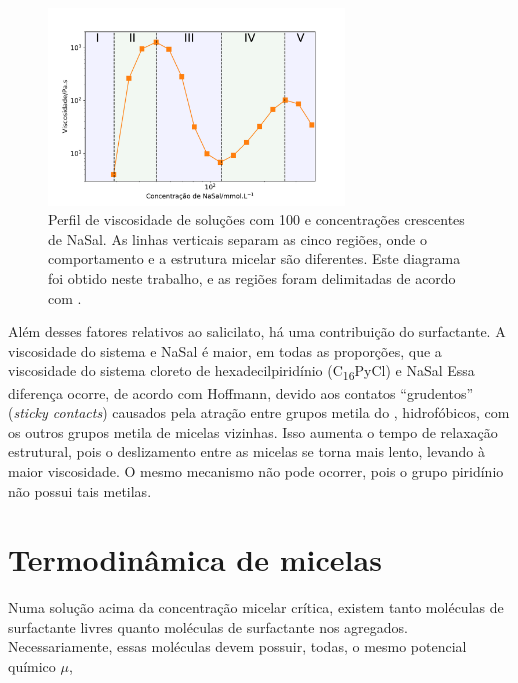 		\begin{figure}[h]
			\centering
			\includegraphics[width=0.7\textwidth]{imagens/reologia/regioes_RH}
			\caption{Perfil de viscosidade de soluções com \CTAB{} 100 \mM{} e concentrações crescentes de NaSal. As linhas verticais separam as cinco regiões, onde o comportamento e a estrutura micelar são diferentes. Este diagrama foi obtido neste trabalho, e as regiões foram delimitadas de acordo com \citeauthor{Rehage1988}.}
			\label{fig:regioes_rh}
		\end{figure}

		Além desses fatores relativos ao salicilato, há uma contribuição do surfactante. A viscosidade do sistema \CTAB{} e NaSal é maior, em todas as proporções, que a viscosidade do sistema cloreto de hexadecilpiridínio (C\textsubscript{16}PyCl) e NaSal \cite{Lutz-Bueno2017}
		Essa diferença ocorre, de acordo com Hoffmann,\cite{Hoffmann2010, Hoffmann2012a, Yamashita2006} devido aos contatos ``grudentos'' (\emph{sticky contacts}) causados pela atração entre grupos metila do \CTAB, hidrofóbicos, com os outros grupos metila de micelas vizinhas. Isso aumenta o tempo de relaxação estrutural, pois o deslizamento entre as micelas se torna mais lento, levando à maior viscosidade. O mesmo mecanismo não pode ocorrer, pois o grupo piridínio não possui tais metilas.  
		

		\section{Termodinâmica de micelas} 
		
		Numa solução acima da concentração micelar crítica, existem tanto moléculas de surfactante livres quanto moléculas de surfactante nos agregados. Necessariamente, essas moléculas devem possuir, todas, o mesmo potencial químico \(\mu\), \cite{Israelachvili2011}
		
